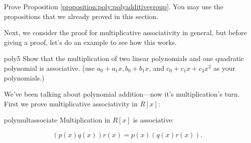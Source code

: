 \begin{exercise}{}
Prove Proposition \ref{proposition:poly:polyadditivegroup}. You may use the propositions that we already proved in this section.
\end{exercise}

Next, we consider the proof for multiplicative associativity in general, but before giving a proof, let's do an example to see how this works.

\begin{exercise}{poly5}
Show that the multiplication of two linear polynomials and one quadratic polynomial is associative. (use $a_0+a_1x, b_0+b_1x$, and $c_0+c_1x+c_2x^2$ as your polynomials.)
\end{exercise}

We've been talking about polynomial addition---now it's multiplication's turn. First we prove multiplicative associativity in $R[x]$:

\begin{prop}{polymultassociate} Multiplication in $R[x]$ is associative: 
	
	\[(p(x) q(x)) r(x)  = p(x) (q(x) r(x)).\]	
\end {prop}

